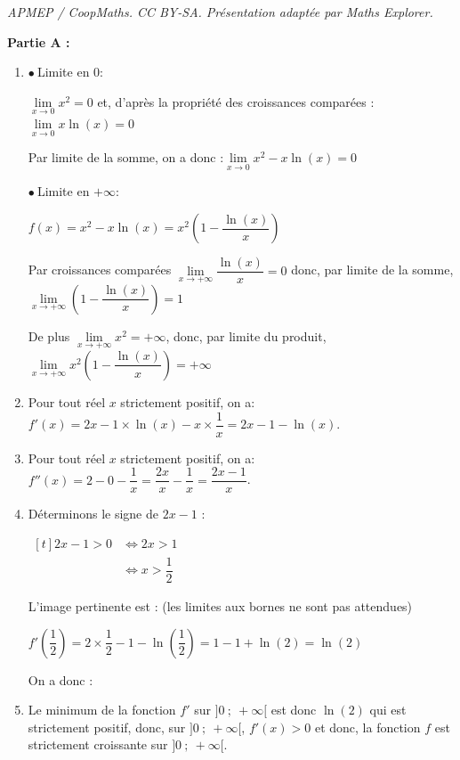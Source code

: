 \documentclass[10pt]{article}
\begin{document}
\noindent\textit{APMEP / CoopMaths. CC BY-SA. Présentation adaptée par Maths Explorer.}\par\medskip
\medskip

\textbf{Partie A :}

\medskip

\begin{enumerate}
	\item $\bullet~$Limite en 0:

$\lim\limits_{x\to 0} x^2 =0$ et, d'après la propriété des croissances comparées : \quad $\lim\limits_{x\to 0}x\ln(x)=0$

Par limite de la somme,  on a donc :\quad $\lim\limits_{x\to 0} x^2-x\ln(x)=0$

$\bullet~$Limite en $+\infty$:

$f(x)=x^2-x\ln(x)=x^2 \left(1-\dfrac{\ln(x)}{x}\right)$

	Par croissances comparées $\lim\limits_{x\to +\infty}\dfrac{\ln(x)}{x}=0$ donc, par limite de la somme, $\lim\limits_{x\to +\infty}\left( 1- \dfrac{\ln(x)}{x}\right)=1$

	De plus $\lim\limits_{x\to +\infty} x^2 =+\infty$, donc, par limite du produit,  $\lim\limits_{x\to +\infty } x^2 \left(1-\dfrac{\ln(x)}{x}\right)=+\infty$

	\item  Pour tout réel $x$ strictement positif, on a: $f'(x) =2x -1 \times \ln(x) -x \times \dfrac{1}{x}= 2x -1 -\ln(x)$.

	\item  Pour tout réel $x$ strictement positif, on a: $f''(x) =2- 0 - \dfrac{1}{x}= \dfrac{2x}{x} -\dfrac{1}{x}= \dfrac{2x-1}{x}$.

	\item  	Déterminons le signe de $2x-1$ :

	$\begin{aligned}[t] 2x-1 >0 &\iff 2x > 1 \\
	&\iff x>\dfrac{1}{2}\end{aligned}$

	L'image pertinente est : (les limites aux bornes ne sont pas attendues)


	$f'\left( \dfrac{1}{2}\right)= 2 \times \dfrac{1}{2}-1-\ln\left(\dfrac{1}{2} \right)= 1-1+\ln(2)=\ln(2)$

	On a donc :


	\item Le minimum  de la fonction $f'$ sur $]0~;~+\infty[$  est donc $\ln(2)$ qui est strictement positif,  donc, sur $]0~;~+\infty[$, $f'(x)>0$ et donc, la fonction $f$ est strictement croissante sur   $]0~;~+\infty[$.
\end{enumerate}
\end{document}

